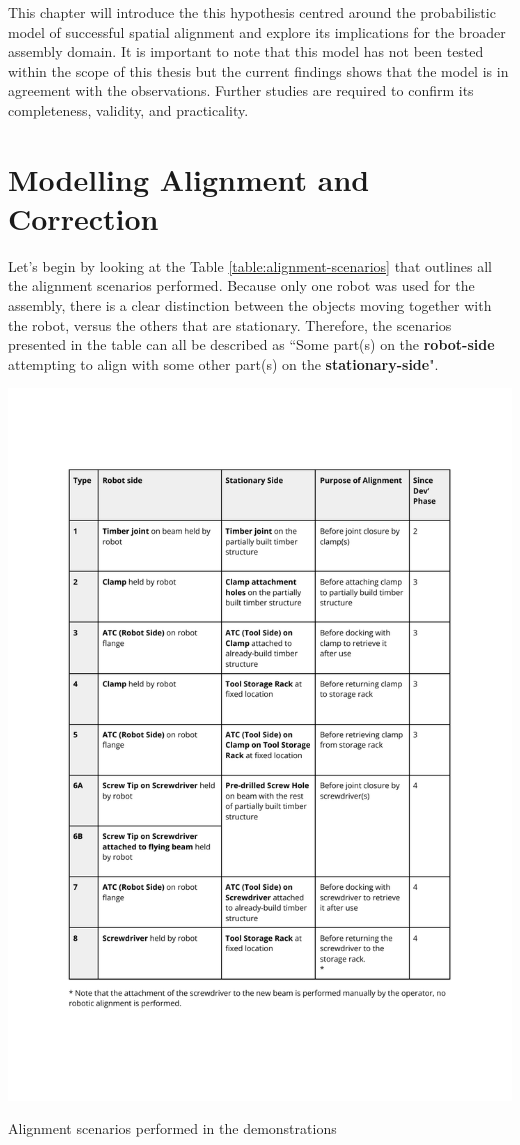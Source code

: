 This chapter will introduce the this hypothesis centred around the probabilistic model of successful spatial alignment and explore its implications for the broader assembly domain. It is important to note that this model has not been tested within the scope of this thesis but the current findings shows that the model is in agreement with the observations. Further studies are required to confirm its completeness, validity, and practicality.

\section{Modelling Alignment and Correction}
\label{section:new-hypo-modelling-alignment-correction}

Let's begin by looking at the Table \ref{table:alignment-scenarios} that outlines all the alignment scenarios performed. Because only one robot was used for the assembly, there is a clear distinction between the objects moving together with the robot, versus the others that are stationary. Therefore, the scenarios presented in the table can all be described as ``Some part(s) on the \textbf{robot-side} attempting to align with some other part(s) on the \textbf{stationary-side}".

\FloatBarrier
\begin{table}[ht]
    \includegraphics[page=1, trim=25.4mm 35mm 25.4mm 33mm, clip, width=\textwidth]{tables/Tables in Chapter 9 to 11.pdf}
    \caption{Alignment scenarios performed in the demonstrations}
    \label{table:alignment-scenarios}
\end{table}
\FloatBarrier

